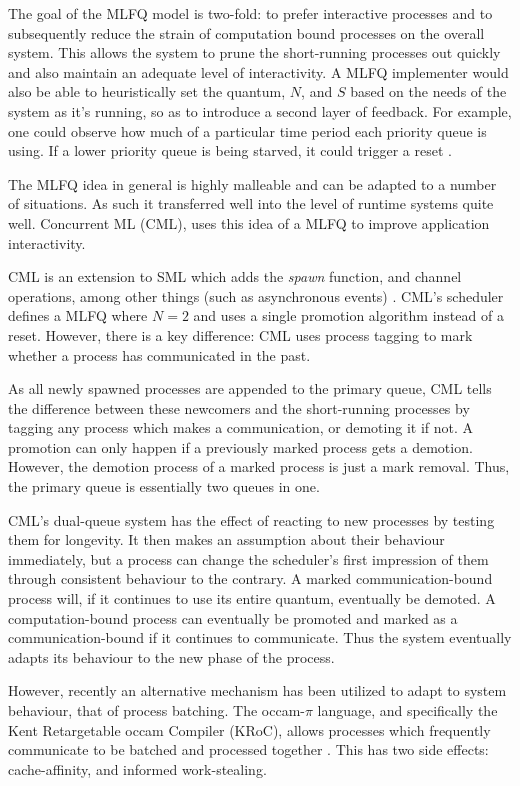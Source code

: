 The goal of the MLFQ model is two-fold: to prefer interactive processes and 
to subsequently reduce the strain of computation bound processes on the overall 
system. This allows the system to prune the short-running processes out quickly
and also maintain an adequate level of interactivity. A MLFQ implementer would 
also be able to heuristically set the quantum, $N$, and $S$ based on the needs 
of the system as it's running, so as to introduce a second layer of feedback. 
For example, one could observe how much of a particular time period each
priority queue is using. If a lower priority queue is being starved, it could
trigger a reset \cite{hoganson2009reducing}.

The MLFQ idea in general is highly malleable and can be adapted to a number of 
situations. As such it transferred well into the level of runtime 
systems quite well. Concurrent ML (CML), uses this idea of a MLFQ to improve 
application interactivity. 

CML is an extension to SML which adds the \emph{spawn} function, and channel 
operations, among other things (such as asynchronous events) 
\cite{reppy1993concurrent}. CML's scheduler defines a MLFQ where $N=2$ and 
uses a single promotion algorithm instead of a reset. However, there is a key
difference: CML uses process tagging to mark whether a process has 
communicated in the past. 

As all newly spawned processes are appended to the
primary queue, CML tells the difference between these newcomers and the
short-running processes by tagging any process which makes a communication, or
demoting it if not. A promotion can only happen if a previously marked process
gets a demotion. However, the demotion process of a marked process is just a 
mark removal. Thus, the primary queue is essentially two queues in one. 

CML's dual-queue system has the effect of reacting to new processes by testing 
them for longevity. It then makes an assumption about their behaviour immediately, but a
process can change the scheduler's first impression of them through consistent
behaviour to the contrary. A marked communication-bound process will, if it
continues to use its entire quantum, eventually be demoted. A computation-bound
process can eventually be promoted and marked as a communication-bound if it 
continues to communicate. Thus the system eventually adapts its behaviour to
the new phase of the process.

However, recently an alternative mechanism has been utilized to adapt to system
behaviour, that of process batching. The occam-$\pi$ language, and specifically 
the Kent Retargetable occam Compiler (KRoC), allows processes which frequently
communicate to be batched and processed together \cite{ritson2012multicore}. 
This has two side effects: cache-affinity, and informed work-stealing.


